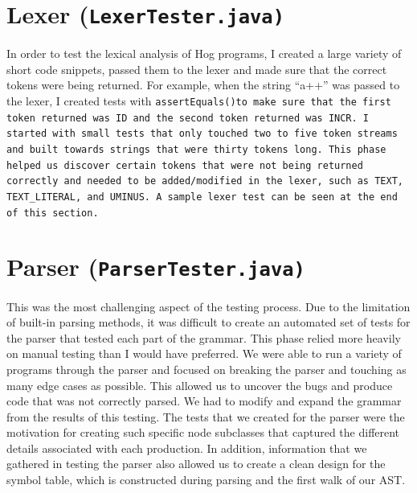 \documentclass{report}
\begin{document}
\section{Lexer (\tt LexerTester.java\rm)}
 
In order to test the lexical analysis of Hog programs, I created a large variety of short code snippets, passed them to the lexer and made sure that the correct tokens were being returned. For example, when the string ``a++'' was passed to the lexer, I created tests with \tt assertEquals()\rm to make sure that the first token returned was ID and the second token returned was INCR. I started with small tests that only touched two to five token streams and built towards strings that were thirty tokens long. This phase helped us discover certain tokens that were not being returned correctly and needed to be added/modified in the lexer, such as \tt TEXT\rm, \tt TEXT\_LITERAL\rm, and \tt UMINUS\rm. A sample lexer test can be seen at the end of this section.

\section{Parser (\tt ParserTester.java\rm)}

This was the most challenging aspect of the testing process. Due to the limitation of built-in parsing methods, it was difficult to create an automated set of tests for the parser that tested each part of the grammar. This phase relied more heavily on manual testing than I would have preferred. We were able to run a variety of programs through the parser and focused on breaking the parser and touching as many edge cases as possible. This allowed us to uncover the bugs and produce code that was not correctly parsed. We had to modify and expand the grammar from the results of this testing. The tests that we created for the parser were the motivation for creating such specific node subclasses that captured the different details associated with each production. In addition, information that we gathered in testing the parser also allowed us to create a clean design for the symbol table, which is constructed during parsing and the first walk of our AST.
\end{document}
